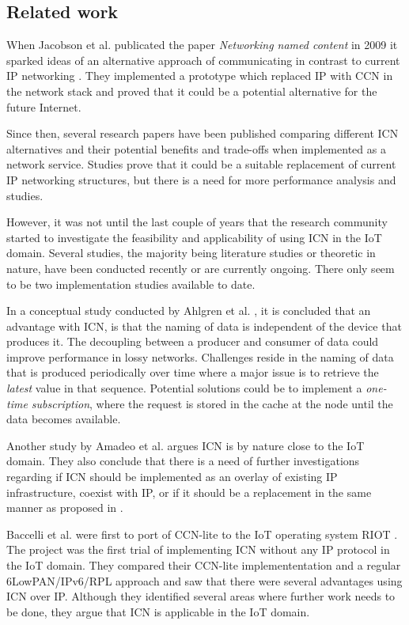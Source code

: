 \subsection{Related work}
When Jacobson et al. publicated the paper \textit{Networking named content} in 2009 it sparked ideas of an alternative approach of communicating in contrast to current IP networking \cite{Jacobson2009}. They implemented a prototype which replaced IP with CCN in the network stack and proved that it could be a potential alternative for the future Internet.

Since then, several research papers have been published comparing different ICN alternatives and their potential benefits and trade-offs when implemented as a network service\cite{Ahlgren2012}. Studies prove that it could be a suitable replacement of current IP networking structures, but there is a need for more performance analysis and studies\cite{Ahlgren2012}\cite{Greek-ICN-networking-survey-2014}.

However, it was not until the last couple of years that the research community started to investigate the feasibility and applicability of using ICN in the IoT domain. Several studies, the majority being literature studies or theoretic in nature, have been conducted recently or are currently ongoing. There only seem to be two implementation studies available to date.

In a conceptual study conducted by Ahlgren et al. \cite{Ahlgreniot}, it is concluded that an advantage with ICN, is that the naming of data is independent of the device that produces it. The decoupling between a producer and consumer of data could improve performance in lossy networks. Challenges reside in the naming of data that is produced periodically over time where a major issue is to retrieve the \textit{latest} value in that sequence. Potential solutions could be to implement a \textit{one-time subscription}, where the request is stored in the cache at the node until the data becomes available\cite{Ahlgreniot}.

Another study by Amadeo et al. \cite{iotchop} argues ICN is by nature close to the IoT domain. They also conclude that there is a need of further investigations regarding if ICN should be implemented as an overlay of existing IP infrastructure, coexist with IP, or if it should be a replacement in the same manner as proposed in \cite{Jacobson2009}.

Baccelli et al. were first to port of CCN-lite to the IoT operating system RIOT \cite{icniotexpinwild}\cite{RIOT}. The project was the first trial of implementing ICN without any IP protocol in the IoT domain. They compared their CCN-lite implemententation and a regular 6LowPAN/IPv6/RPL approach and saw that there were several advantages using ICN over IP. Although they identified several areas where further work needs to be done, they argue that ICN is applicable in the IoT domain.

